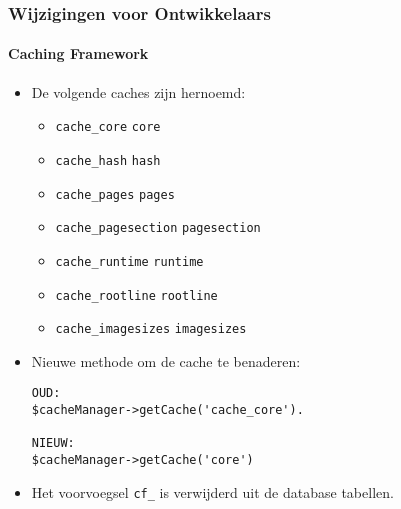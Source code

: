 
\begin{frame}[fragile]
	\frametitle{Wijzigingen voor Ontwikkelaars}
	\framesubtitle{Caching Framework}

	\lstset{basicstyle=\tiny\ttfamily}

	\begin{itemize}
		\item De volgende caches zijn hernoemd:

			\begin{itemize}\smaller
				\item \texttt{cache\_core} \textrightarrow\hspace{0.1cm}\texttt{core}
				\item \texttt{cache\_hash} \textrightarrow\hspace{0.1cm}\texttt{hash}
				\item \texttt{cache\_pages} \textrightarrow\hspace{0.1cm}\texttt{pages}
				\item \texttt{cache\_pagesection} \textrightarrow\hspace{0.1cm}\texttt{pagesection}
				\item \texttt{cache\_runtime} \textrightarrow\hspace{0.1cm}\texttt{runtime}
				\item \texttt{cache\_rootline} \textrightarrow\hspace{0.1cm}\texttt{rootline}
				\item \texttt{cache\_imagesizes} \textrightarrow\hspace{0.1cm}\texttt{imagesizes}
			\end{itemize}\normalsize

		\item Nieuwe methode om de cache te benaderen:

\begin{lstlisting}
OUD:
$cacheManager->getCache('cache_core').

NIEUW:
$cacheManager->getCache('core')
\end{lstlisting}

		\item Het voorvoegsel \texttt{cf\_} is verwijderd uit de database tabellen.
	\end{itemize}

\end{frame}

